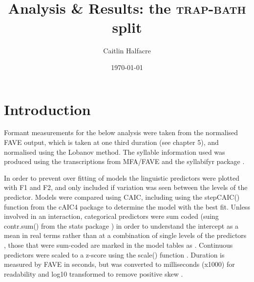 \documentclass[../../../00.FullDoc/tex/ThesisSkeleton-draft2]{subfiles}
\title{Analysis \& Results: the \textsc{trap}-\textsc{bath} split}
\author{Caitlin Halfacre}
\date{\today}
\begin{document}
	
	\newcommand{\onlyinsubfile}[1]{#1}
	\newcommand{\notinsubfile}[1]{}
	\maketitle
	\pagebreak
	\tableofcontents
	\onehalfspacing
	\pagestyle{scrheadings}
	
\section{Introduction}
Formant measurements for the below analysis were taken from the normalised FAVE \citep{FAVE} output, which is taken at one third duration (see chapter \onlyinsubfile{5}\notinsubfile{\ref{ch:Methodology}}), and normalised using the Lobanov method. The syllable information used was produced using the transcriptions from MFA/FAVE and the syllabifyr package \citep{syllabifyr}.

In order to prevent over fitting of models the linguistic predictors were plotted with F1 and F2, and only included if variation was seen between the levels of the predictor. Models were compared using CAIC, including using the stepCAIC() function from the cAIC4 package \citep{cAIC4} to determine the model with the best fit. Unless involved in an interaction, categorical predictors were sum coded (suing contr.sum() from the stats package \citealt{RCoreTeam2021}) in order to understand the intercept as a mean in real terms rather than at a combination of single levels of the predictors \cite{Winter2019}, those that were sum-coded are marked in the model tables as . Continuous predictors were scaled to a z-score using the scale() function \citep{RCoreTeam2021}. Duration is measured by FAVE in seconds, but was converted to milliseconds (x1000) for readability and log10 transformed to remove positive skew \cite{Winter2019}.
\end{document}
